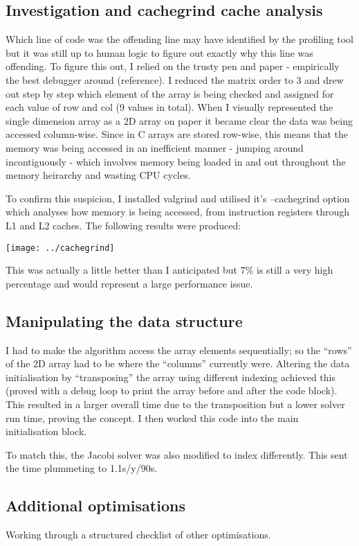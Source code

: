 \documentclass[10pt]{article}
\begin{document}
\subsection{Investigation and cachegrind cache analysis}
Which line of code was the offending line may have identified by the
profiling tool but it was still up to human logic to figure out
exactly why this line was offending. To figure this out, I relied on
the trusty pen and paper - empirically the best debugger around
(reference). I reduced the matrix order to 3 and drew out step by step
which element of the array is being checked and assigned for each
value of row and col (9 values in total). When I visually represented
the single dimension array as a 2D array on paper it became clear the
data was being accessed column-wise. Since in C arrays are stored
row-wise, this means that the memory was being accessed in an
inefficient manner - jumping around incontiguously - which involves
memory being loaded in and out throughout the memory heirarchy and
wasting CPU cycles.

To confirm this suspicion, I installed valgrind and utilised it's
--cachegrind option which analyses how memory is being accessed, from
instruction registers through L1 and L2 caches. The following results
were produced:

\texttt{[image: ../cachegrind]}

This was actually a little better than I anticipated but 7\% is still
a very high percentage and would represent a large performance issue.

\subsection{Manipulating the data structure}
I had to make the algorithm access the array elements sequentially; so
the ``rows'' of the 2D array had to be where the ``columns'' currently
were. Altering the data initialisation by ``transposing'' the array
using different indexing achieved this (proved with a debug loop to
print the array before and after the code block). This resulted in a
larger overall time due to the transposition but a lower solver run
time, proving the concept. I then worked this code into the main
initialisation block.

To match this, the Jacobi solver was also modified to index
differently. This sent the time plummeting to 1.1s/y/90s.

\subsection{Additional optimisations}
Working through a structured checklist of other optimisations.
\end{document}
